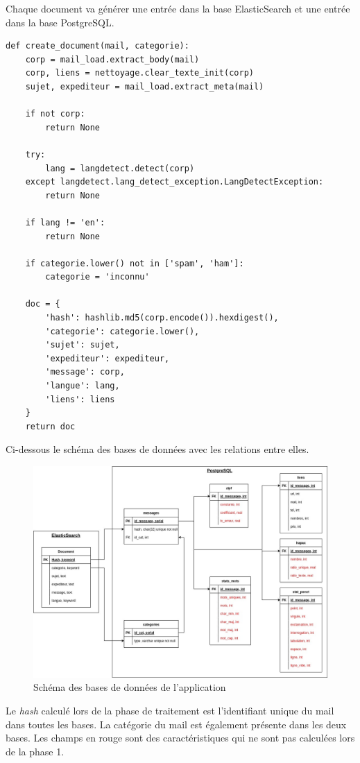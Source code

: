 \documentclass[a4paper,12pt]{article}
\begin{document}
				Chaque document va générer une entrée dans la base ElasticSearch et une entrée dans la base PostgreSQL. 
				
				\begin{lstlisting}[title=Création d'un document]
def create_document(mail, categorie):
    corp = mail_load.extract_body(mail)
    corp, liens = nettoyage.clear_texte_init(corp)
    sujet, expediteur = mail_load.extract_meta(mail)

    if not corp:
        return None

    try:
        lang = langdetect.detect(corp)
    except langdetect.lang_detect_exception.LangDetectException:
        return None

    if lang != 'en':
        return None

    if categorie.lower() not in ['spam', 'ham']:
        categorie = 'inconnu'

    doc = {
        'hash': hashlib.md5(corp.encode()).hexdigest(),
        'categorie': categorie.lower(),
        'sujet': sujet,
        'expediteur': expediteur,
        'message': corp,
        'langue': lang,
        'liens': liens
    }
    return doc
				\end{lstlisting}
			
			Ci-dessous le schéma des bases de données avec les relations entre elles.			
			\begin{figure}[H]
				\includegraphics[width=\linewidth]{img/SchemaBdd.jpg}
				\caption{Schéma des bases de données de l'application}
			\end{figure}
			Le \emph{hash} calculé lors de la phase de traitement est l'identifiant unique du mail dans toutes les bases. La catégorie du mail est également présente dans les deux bases. 
			Les champs en rouge sont des caractéristiques qui ne sont pas calculées lors de la phase 1.
		
\end{document}
